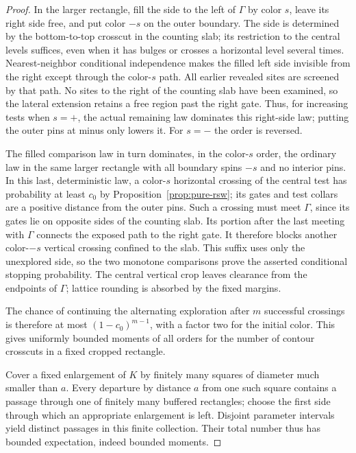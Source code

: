 \begin{proof}
In the larger rectangle, fill the side to the left of $\Gamma$ by
color $s$, leave its right side free, and put color $-s$ on the outer
boundary.  The side is determined by the bottom-to-top crosscut in the
counting slab; its restriction to the central levels suffices, even
when it has bulges or crosses a horizontal level several times.
Nearest-neighbor conditional independence makes the filled left side
invisible from the right except through the color-$s$ path.  All
earlier revealed sites are screened by that path.  No sites to the
right of the counting slab have been examined, so the lateral extension
retains a free region past the right gate.  Thus, for increasing tests
when $s=+$, the actual remaining law dominates this right-side law;
putting the outer pins at minus only lowers it.  For $s=-$ the order
is reversed.

The filled comparison law in turn dominates, in the color-$s$ order,
the ordinary law in the same larger rectangle with all boundary spins
$-s$ and no interior pins.  In this last, deterministic law, a
color-$s$ horizontal crossing of the central test has probability at
least $c_0$ by Proposition~\ref{prop:pure-rsw}; its gates and test
collars are a positive distance from the outer pins.  Such a crossing
must meet $\Gamma$, since its gates lie on opposite sides of the
counting slab.  Its portion after the last meeting with $\Gamma$
connects the exposed path to the right gate.  It therefore blocks
another color-$-s$ vertical crossing confined to the slab.  This
suffix uses only the unexplored side, so the two monotone comparisons
prove the asserted conditional stopping probability.  The central
vertical crop leaves clearance from the endpoints of $\Gamma$;
lattice rounding is absorbed by the fixed margins.

The chance of continuing the alternating exploration after $m$
successful crossings is therefore at most $(1-c_0)^{m-1}$, with a
factor two for the initial color.  This gives uniformly bounded
moments of all orders for the number of contour crosscuts in a fixed
cropped rectangle.

Cover a fixed enlargement of $K$ by finitely many squares of diameter
much smaller than $a$.  Every departure by distance $a$ from one such
square contains a passage through one of finitely many buffered
rectangles; choose the first side through which an appropriate
enlargement is left.  Disjoint parameter intervals yield distinct
passages in this finite collection.  Their total number thus has
bounded expectation, indeed bounded moments.


\end{proof}
